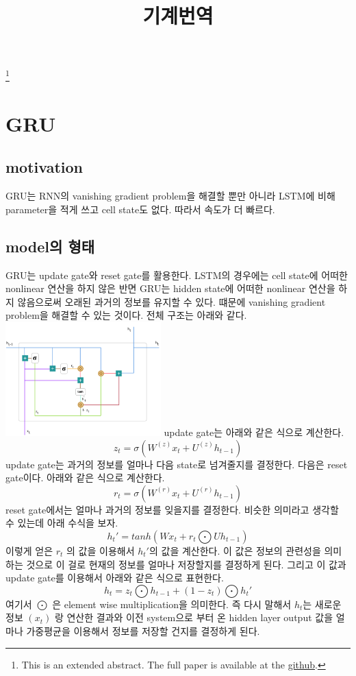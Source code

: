 \documentclass[extendedabs]{bmvc2k}
\begin{document}
\title{기계번역}
\maketitle
\let\thefootnote\relax\footnote{This is an extended abstract. The full paper is available at the \href{https://github.com/LeeGwanHui/TIL/tree/main/deeplearning_ham}{github}. }
\vspace{-0.2in}

 \section{GRU\cite{GRU}}
 \subsection{motivation}
 \quad GRU는 RNN의 vanishing gradient problem을 해결할 뿐만 아니라 LSTM에 비해 parameter을 적게 쓰고 cell state도 없다. 따라서 속도가 더 빠르다.

 \subsection{model의 형태\cite{youtube}}
 \quad GRU는 update gate와 reset gate를 활용한다. LSTM의 경우에는 cell state에 어떠한 nonlinear 연산을 하지 않은 반면 
 GRU는 hidden state에 어떠한 nonlinear 연산을 하지 않음으로써 오래된 과거의 정보를 유지할 수 있다. 떄문에 vanishing gradient problem을 해결할 수 있는 것이다.
 전체 구조는 아래와 같다.
 \newline  \includegraphics[width=6cm]{images/01_GRU.PNG}
 \newline update gate는 아래와 같은 식으로 계산한다. 
 $$ z_t = \sigma (W^{(z)}x_t + U^{(z)}h_{t-1})$$
 update gate는 과거의 정보를 얼마나 다음 state로 넘겨줄지를 결정한다.
 다음은 reset gate이다. 아래와 같은 식으로 계산한다.
 $$ r_t = \sigma(W^{(r)}x_t + U^{(r)}h_{t-1}) $$
 reset gate에서는 얼마나 과거의 정보를 잊을지를 결정한다. 비슷한 의미라고 생각할 수 있는데 아래 수식을 보자.
 $$ h_t' = tanh(Wx_t + r_t \bigodot U h_{t-1} ) $$
 이렇게 얻은 $r_t$ 의 값을 이용해서 $h_t'$의 값을 계산한다. 이 값은 정보의 관련성을 의미하는 것으로 이 걸로 현재의 정보를 얼마나 저장할지를 결정하게 된다. 
 그리고 이 값과 update gate를 이용해서 아래와 같은 식으로 표현한다.
 $$ h_t = z_t \bigodot h_{t-1} + (1 - z_t) \bigodot h_t'$$
 여기서 $\bigodot$ 은 element wise multiplication을 의미한다. 즉 다시 말해서 $h_t$는 새로운 정보 $(x_t)$ 랑 연산한 결과와 이전 system으로 부터 온 hidden layer output 값을
 얼마나 가중평균을 이용해서 정보를 저장할 건지를 결정하게 된다. 
\end{document}
